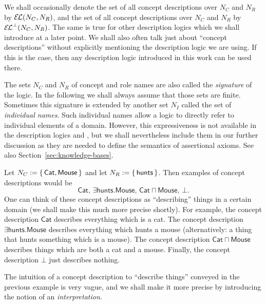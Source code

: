 We shall occasionally denote the set of all \EL concept descriptions over $N_C$ and $N_R$
by ${\mathcal{E}\kern-.3ex\mathcal{L}}(N_C, N_R)$, and the set of all \ELbot concept descriptions over $N_C$ and $N_R$ by
${{\mathcal{E}\kern-.3ex\mathcal{L}}^\bot}(N_C, N_R)$.  The same is true for other description logics which we shall
introduce at a later point.  We shall also often talk just about ``concept descriptions''
without explicitly mentioning the description logic we are using.  If this is the case,
then any description logic introduced in this work can be used there.

The sets $N_C$ and $N_R$ of concept and role names are also called the \emph{signature} of
the logic.  In the following we shall always assume that those sets are finite.  Sometimes
this signature is extended by another set $N_I$ called the set of \emph{individual names}.
Such individual names allow a logic to directly refer to individual elements of a domain.
However, this expressiveness is not available in the description logics \EL and \ELbot,
but we shall nevertheless include them in our further discussion as they are needed to
define the semantics of assertional axioms.  See also Section~\ref{sec:knowledge-bases}.

\begin{Example}
  \label{expl:tom-and-jerry-1}
  Let $N_C := {\{\, \mathsf{Cat}, \mathsf{Mouse} \,\}}$ and let $N_R := {\{\, \mathsf{hunts}
  \,\}}$.  Then examples of \ELbot concept descriptions would be
  \begin{equation*}
    \mathsf{Cat}, \, \mathsf{\exists hunts. Mouse}, \, \mathsf{Cat \sqcap Mouse}, \, \bot.
  \end{equation*}
  One can think of these concept descriptions as ``describing'' things in a certain domain
  (we shall make this much more precise shortly).  For example, the concept description
  $\mathsf{Cat}$ describes everything which is a cat.  The concept description
  $\mathsf{\exists hunts. Mouse}$ describes everything which hunts a mouse (alternatively:
  a thing that hunts something which is a mouse).  The concept description $\mathsf{Cat
    \sqcap Mouse}$ describes things which are both a cat and a mouse.  Finally, the
  concept description $\bot$ just describes nothing.
\end{Example}

The intuition of a concept description to ``describe things'' conveyed in the previous
example is very vague, and we shall make it more precise by introducing the notion of an
\emph{interpretation}.

